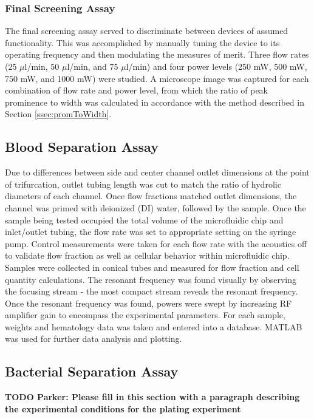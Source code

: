 \subsubsection{Final Screening Assay}
\label{sssec:finalScreen}

The final screening assay served to discriminate between devices of assumed functionality. This was accomplished by manually tuning the device to its operating frequency and then modulating the measures of merit. Three flow rates (25 $\mu$l/min, 50 $\mu$l/min, and 75 $\mu$l/min) and four power levels (250 mW, 500 mW, 750 mW, and 1000 mW) were studied. A microscope image was captured for each combination of flow rate and power level, from which the ratio of peak prominence to width was calculated in accordance with the method described in Section \ref{ssec:promToWidth}.

\subsection{Blood Separation Assay}
\label{ssec:bloodAssay}

Due to differences between side and center channel outlet dimensions at the point of trifurcation, outlet tubing length was cut to match the ratio of hydrolic diameters of each channel. Once flow fractions matched outlet dimensions, the channel was primed with deionized (DI) water, followed by the sample.  Once the sample being tested occupied the total volume of the microfluidic chip and inlet/outlet tubing, the flow rate was set to appropriate setting on the syringe pump.  Control measurements were taken for each flow rate with the acoustics off to validate flow fraction as well as cellular behavior within microfluidic chip.  Samples were collected in conical tubes and measured for flow fraction and cell quantity calculations. The resonant frequency was found visually by observing the focusing stream - the most compact stream reveals the resonant frequency.  Once the resonant frequency was found, powers were swept by increasing RF amplifier gain to encompass the experimental parameters.  For each sample, weights and hematology data was taken and entered into a database.  MATLAB was used for further data analysis and plotting.

\subsection{Bacterial Separation Assay}
\label{ssec:bacteriaAssay}

\textbf{TODO Parker: Please fill in this section with a paragraph describing the experimental conditions for the plating experiment}

